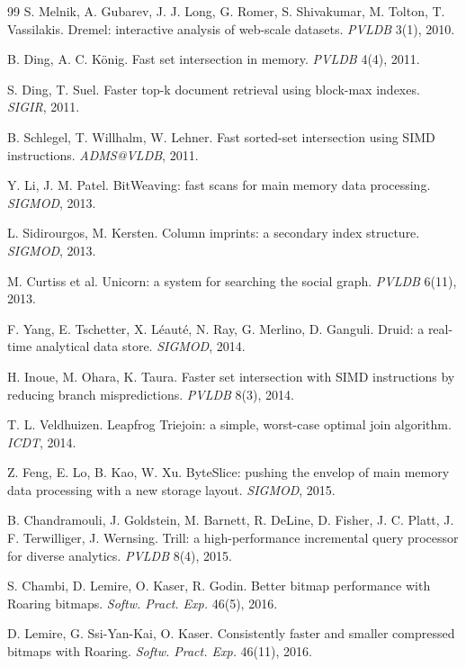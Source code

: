 \documentclass[sigconf,nonacm]{acmart}
\begin{document}
\begin{thebibliography}{99}
 S. Melnik, A. Gubarev, J. J. Long, G. Romer,
S. Shivakumar, M. Tolton, T. Vassilakis. Dremel: interactive analysis
of web-scale datasets. \emph{PVLDB} 3(1), 2010.

 B. Ding, A. C. K\"onig. Fast set intersection
in memory. \emph{PVLDB} 4(4), 2011.

 S. Ding, T. Suel. Faster top-k document retrieval
using block-max indexes. \emph{SIGIR}, 2011.

 B. Schlegel, T. Willhalm, W. Lehner. Fast
sorted-set intersection using SIMD instructions. \emph{ADMS@VLDB},
2011.

 Y. Li, J. M. Patel. BitWeaving: fast scans for
main memory data processing. \emph{SIGMOD}, 2013.

 L. Sidirourgos, M. Kersten. Column imprints: a
secondary index structure. \emph{SIGMOD}, 2013.

 M. Curtiss et al. Unicorn: a system for searching
the social graph. \emph{PVLDB} 6(11), 2013.

 F. Yang, E. Tschetter, X. L\'eaut\'e, N. Ray,
G. Merlino, D. Ganguli. Druid: a real-time analytical data store.
\emph{SIGMOD}, 2014.

 H. Inoue, M. Ohara, K. Taura. Faster set
intersection with SIMD instructions by reducing branch mispredictions.
\emph{PVLDB} 8(3), 2014.

 T. L. Veldhuizen. Leapfrog Triejoin: a simple,
worst-case optimal join algorithm. \emph{ICDT}, 2014.

 Z. Feng, E. Lo, B. Kao, W. Xu. ByteSlice:
pushing the envelop of main memory data processing with a new storage
layout. \emph{SIGMOD}, 2015.

 B. Chandramouli, J. Goldstein, M. Barnett,
R. DeLine, D. Fisher, J. C. Platt, J. F. Terwilliger, J. Wernsing.
Trill: a high-performance incremental query processor for diverse
analytics. \emph{PVLDB} 8(4), 2015.

 S. Chambi, D. Lemire, O. Kaser, R. Godin. Better
bitmap performance with Roaring bitmaps. \emph{Softw. Pract. Exp.}
46(5), 2016.

 D. Lemire, G. Ssi-Yan-Kai, O. Kaser.
Consistently faster and smaller compressed bitmaps with Roaring.
\emph{Softw. Pract. Exp.} 46(11), 2016.


\end{thebibliography}
\end{document}
